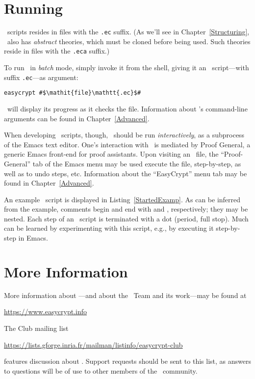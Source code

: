 \section{Running \EasyCrypt}

\EasyCrypt\ scripts resides in files with the \texttt{.ec} suffix. (As
we'll see in Chapter~\ref{Structuring}, \EasyCrypt\ also has
\emph{abstract} theories, which must be cloned before being used. Such
theories reside in files with the \texttt{.eca} suffix.)

To run
\EasyCrypt\ in \emph{batch} mode, simply invoke it from the shell,
giving it an \EasyCrypt\ script---with suffix \texttt{.ec}---as argument:
\begin{lstlisting}
easycrypt #$\mathit{file}\mathtt{.ec}$#
\end{lstlisting}
\EasyCrypt\ will display its progress as it checks the file.
Information about \EasyCrypt's command-line arguments can be found
in Chapter~\ref{Advanced}.

When developing \EasyCrypt\ scripts, though, \EasyCrypt\ should be run
\emph{interactively}, as a subprocess of the Emacs text editor. One's
interaction with \EasyCrypt\ is mediated by Proof General, a generic
Emacs front-end for proof assistants.  Upon visiting an \EasyCrypt\
file, the ``Proof-General'' tab of the Emacs menu may be used execute
the file, step-by-step, as well as to undo steps, etc. Information
about the ``EasyCrypt'' menu tab may be found in
Chapter~\ref{Advanced}.

An example \EasyCrypt\ script is displayed in
Listing~\ref{StartedExamp}.
As can be inferred from the example, comments begin and end with
\ec{(*} and \ec{*)}, respectively; they may be nested. Each step of an
\EasyCrypt\ script is terminated with a dot (period, full stop).  Much
can be learned by experimenting with this script, e.g., by executing
it step-by-step in Emacs.

\section{More Information}

More information about \EasyCrypt---and about the \EasyCrypt\ Team
and its work---may be found at
\begin{center}
  \url{https://www.easycrypt.info}
\end{center}
The \EasyCrypt Club mailing list
\begin{center}
  \url{https://lists.gforge.inria.fr/mailman/listinfo/easycrypt-club}
\end{center}
features discussion about \EasyCrypt.
Support requests should be sent to this list, as answers to questions
will be of use to other members of the \EasyCrypt\ community.

